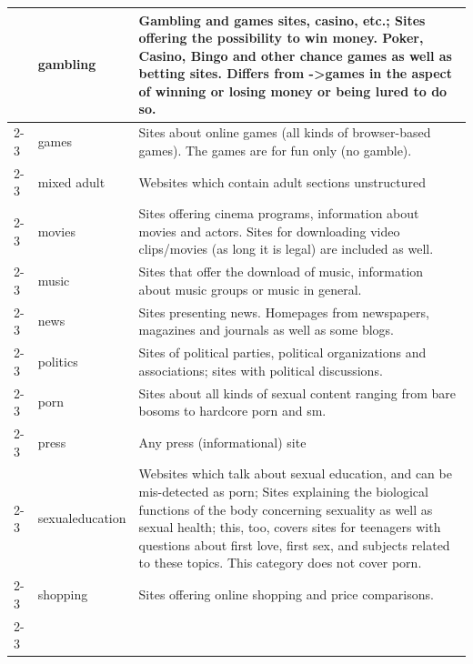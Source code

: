 \begin{longtable}{p{}|p{}|p{}}
                                                         & gambling & Gambling and games sites, casino, etc.; Sites offering the possibility to win money. Poker, Casino, Bingo and other chance games as well as betting sites. Differs from ->games in the aspect of winning or losing money or being lured to do so. \\ \cline{2-3}
                                                         & games & Sites about online games (all kinds of browser-based games). The games are for fun only (no gamble).\\ \cline{2-3}
                                                         & mixed adult & Websites which contain adult sections unstructured\\ \cline{2-3}
                                                         & movies & Sites offering cinema programs, information about movies and actors. Sites for downloading video clips/movies (as long it is legal) are included as well.\\ \cline{2-3}
                                                         & music & Sites that offer the download of music, information about music groups or music in general.\\ \cline{2-3}
                                                         & news & Sites presenting news. Homepages from newspapers, magazines and journals as well as some blogs.\\ \cline{2-3}
                                                         & politics & Sites of political parties, political organizations and associations; sites with political discussions.\\ \cline{2-3}
                                                         & porn & Sites about all kinds of sexual content ranging from bare bosoms to hardcore porn and sm.\\ \cline{2-3}
                                                         & press & Any press (informational) site \\ \cline{2-3}
                                                         & sexualeducation & Websites which talk about sexual education, and can be mis-detected as porn; Sites explaining the biological functions of the body concerning sexuality as well as sexual health; this, too, covers sites for teenagers with questions about first love, first sex, and subjects related to these topics. This category does not cover porn. \\ \cline{2-3}
                                                         & shopping & Sites offering online shopping and price comparisons. \\ \cline{2-3}

\end{longtable}
